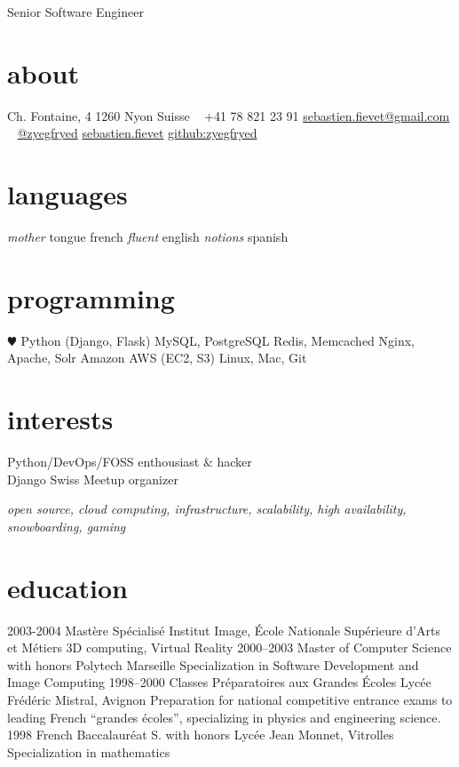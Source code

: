 \documentclass[]{friggeri-cv}
\begin{document}
       {Senior Software Engineer}


\begin{aside}
  \section{about}
    {\FA \faHome} Ch. Fontaine, 4
    1260 Nyon
    Suisse
    ~
    {\FA \faPhone} +41 78 821 23 91
    {\FA \faEnvelope} \href{mailto:sebastien.fievet@gmail.com}{sebastien.fievet@gmail.com}
    ~
    \href{https://twitter.com/zyegfryed}{{\FA \faTwitter} @zyegfryed}
    \href{http://www.linkedin.com/in/sebastienfievet}{{\FA \faLinkedin} sebastien.fievet}
    \href{https://github.com/zyegfryed}{{\FA \faGithub} github:zyegfryed}
  \section{languages}
    \emph{mother} tongue french
    \emph{fluent} english
    \emph{notions} spanish
  \section{programming}
    {\color{red} $\varheartsuit$} Python
    (Django, Flask)
    MySQL, PostgreSQL
    Redis, Memcached
    Nginx, Apache, Solr
    Amazon AWS (EC2, S3)
    Linux, Mac, Git
\end{aside}

\section{interests}

Python/DevOps/FOSS enthousiast \& hacker\\
Django Swiss Meetup organizer

\emph{open source, cloud computing, infrastructure, scalability, high availability, snowboarding, gaming}

\section{education}

\begin{entrylist}
  \entry
    {2003-2004}
    {Mastère Spécialisé}
    {Institut Image, École Nationale Supérieure d'Arts et Métiers}
    {3D computing, Virtual Reality}
  \entry
    {2000–2003}
    {Master of Computer Science with honors}
    {Polytech Marseille}
    {Specialization in Software Development and Image Computing}
  \entry
    {1998–2000}
    {Classes Préparatoires aux Grandes Écoles}
    {Lycée Frédéric Mistral, Avignon}
    {Preparation for national competitive entrance exams to leading French ``grandes écoles'', specializing in physics and engineering science.}
  \entry
    {1998}
    {French Baccalauréat S. with honors}
    {Lycée Jean Monnet, Vitrolles}
    {Specialization in mathematics}
\end{entrylist}
\end{document}
